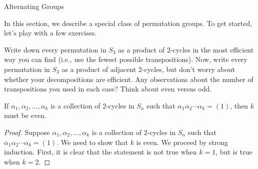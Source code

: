 \begin{section}{Alternating Groups}

In this section, we describe a special class of permutation groups.  To get started, let's play with a few exercises.

\begin{problem}
Write down every permutation in $S_3$ as a product of 2-cycles in the most efficient way you can find (i.e., use the fewest possible transpositions).  Now, write every permutation in $S_3$ as a product of adjacent 2-cycles, but don't worry about whether your decompositions are efficient.  Any observations about the number of transpositions you used in each case?  Think about even versus odd.
\end{problem}

\begin{theorem}
If $\alpha_1,\alpha_2,\ldots,\alpha_k$ is a collection of 2-cycles in $S_n$ such that $\alpha_1\alpha_2\cdots\alpha_k=(1)$, then $k$ must be even.
\end{theorem}

\begin{proof}
Suppose $\alpha_1,\alpha_2,\ldots,\alpha_k$ is a collection of 2-cycles in $S_n$ such that $\alpha_1\alpha_2\cdots\alpha_k=(1)$.  We need to show that $k$ is even. We proceed by strong induction. First, it is clear that the statement is not true when $k=1$, but is true when $k=2$. 


\end{proof}
\end{section}
